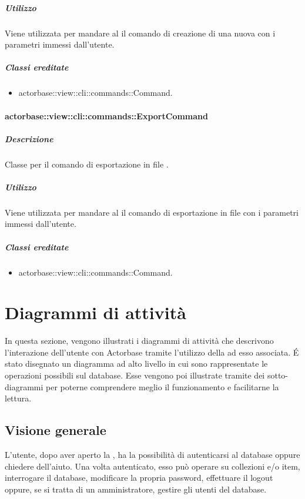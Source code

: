 \documentclass{scalatekids-article}
\begin{document}
\subparagraph{Utilizzo}

Viene utilizzata per mandare al  il comando di creazione di
una nuova  con i parametri immessi dall'utente.

\subparagraph{Classi ereditate}

\begin{itemize}
\item actorbase::view::cli::commands::Command.
\end{itemize}

\paragraph{actorbase::view::cli::commands::ExportCommand}

\subparagraph{Descrizione}

Classe per il comando di esportazione in file .

\subparagraph{Utilizzo}

Viene utilizzata per mandare al  il comando di esportazione
in file  con i parametri immessi dall'utente.

\subparagraph{Classi ereditate}

\begin{itemize}
\item actorbase::view::cli::commands::Command.
\end{itemize}

\section{Diagrammi di attività}

In questa sezione, vengono illustrati i diagrammi di attività che descrivono
l'interazione dell'utente con Actorbase tramite l'utilizzo della 
ad esso associata.  É stato disegnato un diagramma ad alto livello in cui sono
rappresentate le operazioni possibili sul database. Esse vengono poi
illustrate tramite dei sotto-diagrammi per poterne comprendere meglio il
funzionamento e facilitarne la lettura.

\subsection{Visione generale}

L'utente, dopo aver aperto la , ha la possibilità di autenticarsi
al database oppure chiedere dell'aiuto. Una volta autenticato, esso può
operare su collezioni e/o item, interrogare il database, modificare la propria
password, effettuare il logout oppure, se si tratta di un amministratore,
gestire gli utenti del database.
\end{document}
